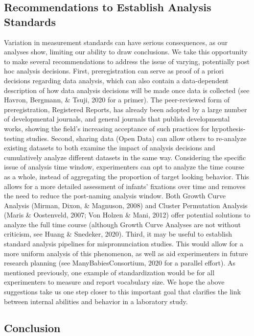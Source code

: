 \documentclass[
  english,
  man, noextraspace]{apa6}
\begin{document}
\hypertarget{recommendations-to-establish-analysis-standards}{%
\subsection{Recommendations to Establish Analysis Standards}\label{recommendations-to-establish-analysis-standards}}

Variation in measurement standards can have serious consequences, as our analyses show, limiting our ability to draw conclusions. We take this opportunity to make several recommendations to address the issue of varying, potentially post hoc analysis decisions. First, preregistration can serve as proof of a priori decisions regarding data analysis, which can also contain a data-dependent description of how data analysis decisions will be made once data is collected (see Havron, Bergmann, \& Tsuji, 2020 for a primer). The peer-reviewed form of preregistration, Registered Reports, has already been adopted by a large number of developmental journals, and general journals that publish developmental works, showing the field's increasing acceptance of such practices for hypothesis-testing studies. Second, sharing data (Open Data) can allow others to re-analyze existing datasets to both examine the impact of analysis decisions and cumulatively analyze different datasets in the same way. Considering the specific issue of analysis time window, experimenters can opt to analyze the time course as a whole, instead of aggregating the proportion of target looking behavior. This allows for a more detailed assessment of infants' fixations over time and removes the need to reduce the post-naming analysis window. Both Growth Curve Analysis (Mirman, Dixon, \& Magnuson, 2008) and Cluster Permutation Analysis (Maris \& Oostenveld, 2007; Von Holzen \& Mani, 2012) offer potential solutions to analyze the full time course (although Growth Curve Analyses are not without criticism, see Huang \& Snedeker, 2020). Third, it may be useful to establish standard analysis pipelines for mispronunciation studies. This would allow for a more uniform analysis of this phenomenon, as well as aid experimenters in future research planning (see ManyBabiesConsortium, 2020 for a parallel effort). As mentioned previously, one example of standardization would be for all experimenters to measure and report vocabulary size. We hope the above suggestions take us one step closer to this important goal that clarifies the link between internal abilities and behavior in a laboratory study.

\hypertarget{conclusion}{%
\subsection{Conclusion}\label{conclusion}}
\end{document}
